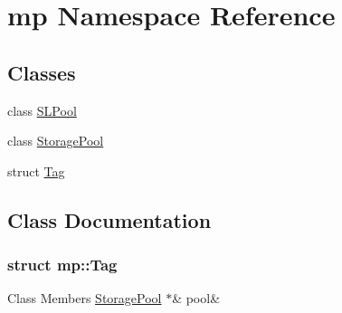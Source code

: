 \hypertarget{namespacemp}{}\section{mp Namespace Reference}
\label{namespacemp}
\subsection*{Classes}
\begin{DoxyCompactItemize}
\item 
class \hyperlink{classmp_1_1_s_l_pool}{S\+L\+Pool}
\item 
class \hyperlink{classmp_1_1_storage_pool}{Storage\+Pool}
\item 
struct \hyperlink{namespacemp_structmp_1_1_tag}{Tag}
\end{DoxyCompactItemize}


\subsection{Class Documentation}
\label{structmp_1_1_tag}
\subsubsection{struct mp\+:\+:Tag}
\begin{DoxyFields}{Class Members}
\mbox{\label{namespacemp_a51ec72e43369ac898ae0be7d9183b0ab}} 
\hyperlink{classmp_1_1_storage_pool}{StoragePool} $\ast$&
pool&
\\
\hline

\end{DoxyFields}
